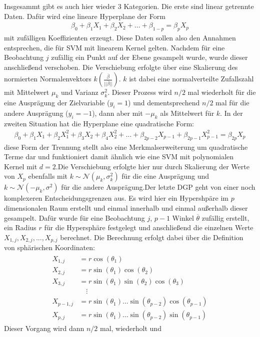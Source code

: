 \documentclass[
]{article}
\begin{document}
Insgesammt gibt es auch hier wieder 3 Kategorien. Die erste sind linear
getrennte Daten. Dafür wird eine lineare Hyperplane der Form
\begin{align}
\beta_0+\beta_1 X_1+\beta_2 X_2 +...+\beta_{1-p} = \beta_p X_p
\end{align} mit zufälligen Koeffizienten erzeugt. Diese Daten sollen
also den Annahmen entsprechen, die für SVM mit linearem Kernel gelten.
Nachdem für eine Beobachtung \(j\) zufällig ein Punkt auf der Ebene
gesampelt wurde, wurde dieser anschließend verschoben. Die Verschiebung
erfolgte über eine Skalierung des normierten Normalenvektors
\(k\left(\frac{\overline{\beta}}{||\overline{\beta}||}\right)\). \(k\)
ist dabei eine normalverteilte Zufallszahl mit Mittelwert \(\mu_k\) und
Varianz \(\sigma^2_k\). Dieser Prozess wird \(n/2\) mal wiederholt für
die eine Ausprägung der Zielvariable (\(y_i=1\)) und dementsprechend
\(n/2\) mal für die andere Ausprägung (\(y_i=-1\)), dann aber mit
\(-\mu_k\) als Mittelwert für \(k\). \newline In der zweiten Situation
hat die Hyperplane eine quadratische Form: \begin{align}
\beta_0+\beta_1 X_1 + \beta_2 X_1^2+\beta_3 X_2+\beta_4 X_2^2+...+\beta_{2p-2}X_{p-1}+\beta_{2p-1}X_{p-1}^2=\beta_{2p} X_p
\end{align} diese Form der Trennung stellt also eine Merkmalserweiterung
um quadratische Terme dar und funktioniert damit ähnlich wie eine SVM
mit polynomialen Kernel mit \(d=2\).Die Verschiebung erfolgte hier nur
durch Skalierung der Werte von \(X_p\) ebenfalls mit
\(k\sim\mathcal{N}(\mu_k,\sigma^2_k)\) für die eine Ausprägung und
\(k\sim\mathcal{N}(-\mu_k,\sigma^2)\) für die andere
Ausprägung.\newline  Der letzte DGP geht von einer noch komplexeren
Entscheidungsgrenzen aus. Es wird hier ein Hypershpäre im \(p\)
dimensionalen Raum erstellt und einmal innerhalb und einmal außerhalb
dieser gesampelt. Dafür wurde für eine Beobachtung \(j\), \(p-1\) Winkel
\(\overline{\theta}\) zufällig erstellt, ein Radius \(r\) für die
Hypersphäre festgelegt und anschließend die einzelnen Werte
\(X_{1,j},X_{2,j},...,X_{p,j}\) berechnet. Die Berechnung erfolgt dabei
über die Definition von sphärischen Koordinaten: \begin{align}
\begin{aligned}
        X_{1,j} &= r \cos(\theta_1)\\
        X_{2,j} &= r \sin(\theta_1)\cos(\theta_2)\\
        X_{3,j} &= r \sin(\theta_1)\sin(\theta_2)\cos(\theta_3)\\
        &\quad \vdots\\
        X_{p-1,j}&=r \sin(\theta_1)\ldots \sin(\theta_{p-2})\cos(\theta_{p-1})\\
        X_{p,j}&=r \sin(\theta_1)\ldots \sin(\theta_{p-2})\sin(\theta_{p-1})
    \end{aligned}
    \end{align} Dieser Vorgang wird dann \(n/2\) mal, wiederholt und
\end{document}
